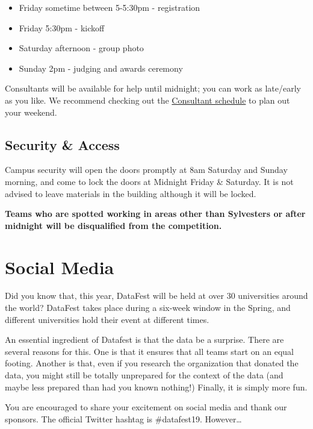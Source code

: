 \documentclass[]{article}
\providecommand{\tightlist}{%
  \setlength{\itemsep}{0pt}\setlength{\parskip}{0pt}}
\begin{document}
\begin{itemize}
\tightlist
\item
  Friday sometime between 5-5:30pm - registration
\item
  Friday 5:30pm - kickoff
\item
  Saturday afternoon - group photo
\item
  Sunday 2pm - judging and awards ceremony
\end{itemize}

Consultants will be available for help until midnight; you can work as
late/early as you like. We recommend checking out the
\href{INSERT\%20LINK}{Consultant schedule} to plan out your weekend.

\hypertarget{security-access}{%
\subsection{Security \& Access}\label{security-access}}

Campus security will open the doors promptly at 8am Saturday and Sunday
morning, and come to lock the doors at Midnight Friday \& Saturday. It
is not advised to leave materials in the building although it will be
locked.

\textbf{Teams who are spotted working in areas other than Sylvesters or
after midnight will be disqualified from the competition.}

\hypertarget{social-media}{%
\section{Social Media}\label{social-media}}

Did you know that, this year, DataFest will be held at over 30
universities around the world? DataFest takes place during a six-week
window in the Spring, and different universities hold their event at
different times.

An essential ingredient of Datafest is that the data be a surprise.
There are several reasons for this. One is that it ensures that all
teams start on an equal footing. Another is that, even if you research
the organization that donated the data, you might still be totally
unprepared for the context of the data (and maybe less prepared than had
you known nothing!) Finally, it is simply more fun.

You are encouraged to share your excitement on social media and thank
our sponsors. The official Twitter hashtag is \#datafest19.
However\ldots{}
\end{document}
